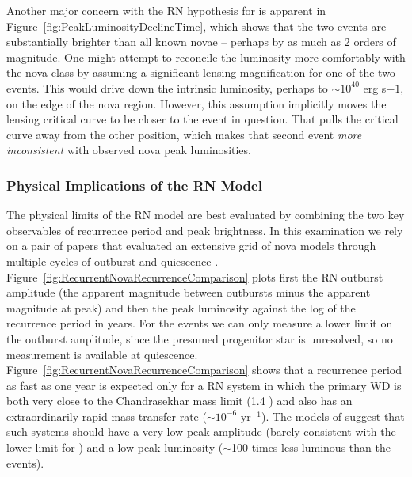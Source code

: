 Another major concern with the RN hypothesis for \spock is apparent
in Figure~\ref{fig:PeakLuminosityDeclineTime}, which shows that the
two \spock events are substantially brighter than all known novae --
perhaps by as much as 2 orders of magnitude.  One might attempt to
reconcile the \spock luminosity more comfortably with the nova class
by assuming a significant lensing magnification for one of the two
events. This would drive down the intrinsic luminosity, perhaps to
$\sim10^{40}$ erg s${-1}$, on the edge of the nova region.  However,
this assumption implicitly moves the lensing critical curve to be
closer to the \spock event in question.  That pulls the critical curve
away from the other \spock position, which makes that second event
{\it more inconsistent} with observed nova peak luminosities.  


\subsubsection{Physical Implications of the RN Model}

The physical limits of the RN model are best evaluated by combining
the two key observables of recurrence period and peak brightness. In
this examination we rely on a pair of papers that evaluated an
extensive grid of nova models through multiple cycles of outburst and
quiescence \citep{Prialnik:1995,Yaron:2005}.
Figure~\ref{fig:RecurrentNovaRecurrenceComparison} plots first the RN
outburst amplitude (the apparent magnitude between outbursts minus the
apparent magnitude at peak) and then the peak luminosity against the
log of the recurrence period in years.
For the \spock events we can only measure a lower limit on the
outburst amplitude, since the presumed progenitor star is unresolved,
so no measurement is available at
quiescence. Figure~\ref{fig:RecurrentNovaRecurrenceComparison} shows
that a recurrence period as fast as one year is expected only for a RN
system in which the primary WD is both very close to the Chandrasekhar
mass limit (1.4 \Msun) and also has an extraordinarily rapid mass
transfer rate ($\sim10^{-6}$ \Msun yr$^{-1}$).  The models of
\citet{Yaron:2005} suggest that such systems should have a very low
peak amplitude (barely consistent with the lower limit for \spock) and
a low peak luminosity ($\sim$100 times less luminous than the \spock
events).

